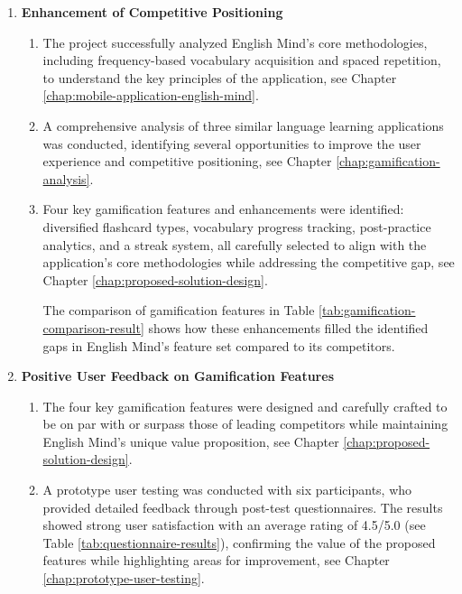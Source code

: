 \begin{enumerate}
    \item \textbf{Enhancement of Competitive Positioning}
    \begin{enumerate}
        \item The project successfully analyzed English Mind's core methodologies, including frequency-based vocabulary acquisition and spaced repetition, to understand the key principles of the application, see Chapter \ref{chap:mobile-application-english-mind}.
        
        \item A comprehensive analysis of three similar language learning applications was conducted, identifying several opportunities to improve the user experience and competitive positioning, see Chapter \ref{chap:gamification-analysis}.
        
        \item Four key gamification features and enhancements were identified: diversified flashcard types, vocabulary progress tracking, post-practice analytics, and a streak system, all carefully selected to align with the application's core methodologies while addressing the competitive gap, see Chapter \ref{chap:proposed-solution-design}.
        
        The comparison of gamification features in Table \ref{tab:gamification-comparison-result} shows how these enhancements filled the identified gaps in English Mind's feature set compared to its competitors.
        \newpage
        
    \end{enumerate}

    \item \textbf{Positive User Feedback on Gamification Features}
    \begin{enumerate}
        \item The four key gamification features were designed and carefully crafted to be on par with or surpass those of leading competitors while maintaining English Mind's unique value proposition, see Chapter \ref{chap:proposed-solution-design}.

        \item A prototype user testing was conducted with six participants, who provided detailed feedback through post-test questionnaires. The results showed strong user satisfaction with an average rating of 4.5/5.0 (see Table \ref{tab:questionnaire-results}), confirming the value of the proposed features while highlighting areas for improvement, see Chapter \ref{chap:prototype-user-testing}.
    \end{enumerate}


\end{enumerate}

